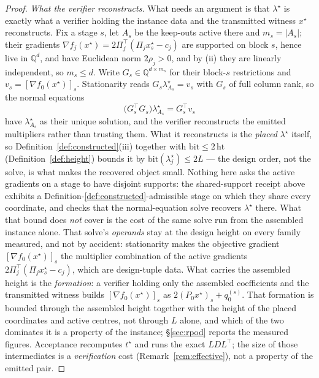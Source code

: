 \documentclass[11pt]{article}
\theoremstyle{definition}
\theoremstyle{remark}
\newcommand{\Q}{\mathbb{Q}}
\renewcommand{\_}{\ifdim\fontdimen3\font=0pt\relax\char`\_\else\textunderscore\fi\hspace{0pt}}
\begin{document}
\begin{proof}
\emph{What the verifier reconstructs.} What needs an argument is that
$\lambda^\star$ is exactly what a verifier holding the instance data and the
transmitted witness $x^\star$ reconstructs. Fix a stage $s$, let $A_s$ be the
keep-outs active there and $m_s=|A_s|$; their gradients
$\nabla f_j(x^\star)=2\Pi_j^\top(\Pi_jx^\star_s-c_j)$ are supported on block
$s$, hence live in $\Q^d$, and have Euclidean norm $2\rho_j>0$, and by (ii)
they are linearly independent, so $m_s\le d$. Write $G_s\in\Q^{d\times m_s}$
for their block-$s$ restrictions and $v_s=[\nabla f_0(x^\star)]_s$.
Stationarity reads $G_s\lambda^\star_{A_s}=v_s$ with $G_s$ of full column
rank, so the normal equations
\[
\bigl(G_s^\top G_s\bigr)\lambda^\star_{A_s}=G_s^\top v_s
\]
have $\lambda^\star_{A_s}$ as their unique solution, and the verifier
reconstructs the emitted multipliers rather than trusting them. What it reconstructs is the
\emph{placed} $\lambda^\star$ itself, so
Definition~\ref{def:constructed}(iii) together with
$\mathrm{bit}\le2\,\mathrm{ht}$ (Definition~\ref{def:height}) bounds it by
$\mathrm{bit}(\lambda^\star_j)\le2L$ --- the design order, not the solve, is
what makes the recovered object small. Nothing here asks the active gradients
on a stage to have disjoint supports: the shared-support receipt above
exhibits a Definition-\ref{def:constructed}-admissible stage on which they
share every coordinate, and checks that the normal-equation solve
recovers $\lambda^\star$ there. What that bound does \emph{not} cover is the
cost of the same solve run from the assembled instance alone. That solve's
\emph{operands} stay at the design height on every family measured, and not
by accident: stationarity makes the objective gradient
$[\nabla f_0(x^\star)]_s$ the multiplier combination of the active gradients
$2\Pi_j^\top(\Pi_jx^\star_s-c_j)$, which are design-tuple data. What carries
the assembled height is the \emph{formation}: a verifier holding only the
assembled coefficients and the transmitted witness builds
$[\nabla f_0(x^\star)]_s$ as $2(P_0x^\star)_s+q_0^{(s)}$. That formation is
bounded through the assembled height together with the height of the placed
coordinates and active centres, not through $L$ alone, and which of the two
dominates it is a property of the instance; \S\ref{sec:rpod} reports the
measured figures. Acceptance recomputes $t^\star$ and runs the exact
$LDL^\top$; the size of those intermediates is a \emph{verification} cost
(Remark~\ref{rem:effective}), not a property of the emitted pair.
\end{proof}
\end{document}
